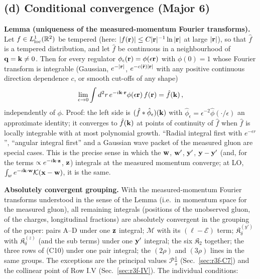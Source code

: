 \subsection{(d) Conditional convergence (Major 6)}\label{sec:r3f-d}
\noindent\textbf{Lemma (uniqueness of the measured-momentum Fourier transforms).} Let $f\in L^1_{\rm loc}(\mathbb R^2)$ be tempered (here: $|f(\mathbf{r})|\le C|\mathbf{r}|^{-1}\ln|\mathbf{r}|$ at large $|\mathbf{r}|$), so that $\hat f$ is a tempered distribution, and let $\hat f$ be continuous in a neighbourhood of $\mathbf{q}=\mathbf{k}\neq0$. Then for every regulator $\phi_\epsilon(\mathbf{r})=\phi(\epsilon\mathbf{r})$ with $\phi(0)=1$ whose Fourier transform is integrable (Gaussian, $e^{-|\mathbf{r}|}$, $e^{-c(\hat{\mathbf{r}})|\mathbf{r}|}$ with any positive continuous direction dependence $c$, or smooth cut-offs of any shape)
\begin{align}
\lim_{\epsilon\to0}\int d^2r\,e^{-i\mathbf{k}\cdot\mathbf{r}}\phi(\epsilon\mathbf{r})\,f(\mathbf{r})=\hat f(\mathbf{k})\,,
\end{align}
independently of $\phi$. Proof: the left side is $(\hat f*\hat\phi_\epsilon)(\mathbf{k})$ with $\hat\phi_\epsilon=\epsilon^{-2}\hat\phi(\cdot/\epsilon)$ an approximate identity; it converges to $\hat f(\mathbf{k})$ at points of continuity of $\hat f$ when $\hat f$ is locally integrable with at most polynomial growth. ``Radial integral first with $e^{-\epsilon r}$'', ``angular integral first'' and a Gaussian wave packet of the measured gluon are special cases. This is the precise sense in which the $\mathbf{w}$, $\mathbf{w}'$, $\mathbf{y}'$, $\mathbf{y}-\mathbf{y}'$ (and, for the terms $\propto e^{-i\mathbf{k}\cdot\mathbf{z}}$, $\mathbf{z}$) integrals at the measured momentum converge; at LO, $\int_we^{-i\mathbf{k}\cdot\mathbf{w}}\mathcal K(\mathbf{x}-\mathbf{w})$, it is the same.

\noindent\textbf{Absolutely convergent grouping.} With the measured-momentum Fourier transforms understood in the sense of the Lemma (i.e.\ in momentum space for the measured gluon), all remaining integrals (positions of the unobserved gluon, of the charges, longitudinal fractions) are absolutely convergent in the grouping of the paper: pairs A--D under one $\mathbf{z}$ integral; $\widehat{\mathcal M}$ with its $(\ell-\mathcal E)$ term; $\mathfrak K^{(y')}_\delta$ with $\mathfrak K^{(z)}_\delta$ (and the sub terms) under one $\mathbf{y}'$ integral; the six $\mathfrak K_2$ together; the three rows of (C10) under one pair integral; the $(2\rho)$ and $(3\rho)$ lines in the same groups. The exceptions are the principal values $\mathcal P\frac1s$ (Sec.~\ref{sec:r3f-C7}) and the collinear point of Row I.V (Sec.~\ref{sec:r3f-IV}). The individual conditions:

